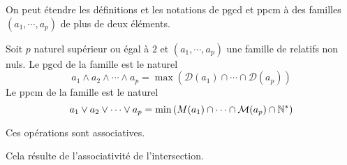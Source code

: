 On peut étendre les définitions et les notations de pgcd et ppcm à des familles $(a_1,\cdots,a_p)$ de plus de deux éléments.
\begin{defi}
Soit $p$ naturel supérieur ou égal à $2$ et $(a_1,\cdots,a_p)$ une famille de relatifs non nuls. Le pgcd de la famille est le naturel  
\begin{displaymath}
  a_1\wedge a_2 \wedge \cdots \wedge a_p = \max\left( \mathcal D(a_1)\cap\cdots \cap\mathcal D(a_p)\right) 
\end{displaymath}
Le ppcm de la famille est le naturel
\begin{displaymath}
  a_1 \vee a_2 \vee \cdots\vee a_p = \min\left( M(a_1)\cap\cdots \cap\mathcal M(a_p)\cap \mathbb{N}^*\right) 
\end{displaymath}
\end{defi}
\begin{prop}
Ces opérations sont associatives.
\end{prop}
\begin{demo}
Cela résulte de l'associativité de l'intersection.
\end{demo}

